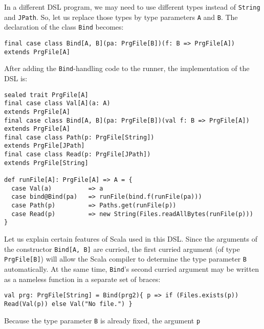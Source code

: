 In a different DSL program, we may need to use different types instead
of \lstinline!String! and
\lstinline!JPath!. So,
let us replace those types by type parameters \lstinline!A!
and \lstinline!B!. The
declaration of the class \lstinline!Bind!
becomes:
\begin{lstlisting}
final case class Bind[A, B](pa: PrgFile[B])(f: B => PrgFile[A]) extends PrgFile[A]
\end{lstlisting}
After adding the \lstinline!Bind!-handling
code to the runner, the implementation of the DSL is:
\begin{lstlisting}
sealed trait PrgFile[A]
final case class Val[A](a: A)                                       extends PrgFile[A]
final case class Bind[A, B](pa: PrgFile[B])(val f: B => PrgFile[A]) extends PrgFile[A]
final case class Path(p: PrgFile[String])                           extends PrgFile[JPath]
final case class Read(p: PrgFile[JPath])                            extends PrgFile[String]

def runFile[A]: PrgFile[A] => A = {
  case Val(a)          => a
  case bind@Bind(pa)   => runFile(bind.f(runFile(pa)))
  case Path(p)         => Paths.get(runFile(p))
  case Read(p)         => new String(Files.readAllBytes(runFile(p)))
}
\end{lstlisting}
Let us explain certain features of Scala used in this DSL. Since the
arguments of the constructor \lstinline!Bind[A, B]!
are curried, the first curried argument (of type \lstinline!PrgFile[B]!)
will allow the Scala compiler to determine the type parameter \lstinline!B!
automatically. At the same time, \lstinline!Bind!\textsf{'}s
second curried argument may be written as a nameless function in a
separate set of braces:
\begin{lstlisting}
val prg: PrgFile[String] = Bind(prg2){ p => if (Files.exists(p)) Read(Val(p)) else Val("No file.") }
\end{lstlisting}
Because the type parameter \lstinline!B!
is already fixed, the argument \lstinline!p!
